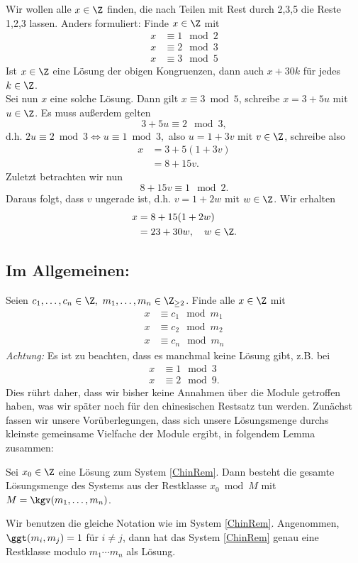 Wir wollen alle $x \in \Z$ finden, die nach Teilen mit Rest durch 2,3,5 die Reste 1,2,3 lassen. Anders formuliert: Finde $x \in \Z$ mit
\begin{align*}
	x &\equiv 1 \mod 2\\
	x &\equiv 2 \mod 3\\
	x &\equiv 3 \mod 5
\end{align*}
Ist $x \in \Z$ eine Lösung der obigen Kongruenzen, dann auch $x + 30k$ für jedes $k \in \Z$.\\
Sei nun $x$ eine solche Lösung. Dann gilt $x \equiv 3 \bmod 5$, schreibe $x = 3+5u$ mit $u \in \Z$. Es muss außerdem gelten
\[ 3 + 5u \equiv 2 \mod 3, \]
d.h. $2u \equiv 2 \bmod 3 \iff u \equiv 1 \bmod 3,$ also $u = 1+3v$ mit $v \in \Z$, schreibe also
\begin{align*}
	x &= 3+5(1+3v)\\
	&= 8+15v.
\end{align*}
Zuletzt betrachten wir nun 
\[ 8+15v \equiv 1 \mod 2. \]
Daraus folgt, dass $v$ ungerade ist, d.h. $v = 1+2w$ mit $w \in \Z$. Wir erhalten
\begin{align*}
	x &= 8+15(1+2w)\\
	&= 23+30w,\quad w \in \Z.
\end{align*}

\subsection*{Im Allgemeinen:}

Seien $c_1,\dotsc,c_n \in \Z,\ m_1,\dotsc,m_n \in \Z_{\geq 2}$. Finde alle $x \in \Z$ mit
\begin{equation}\label{ChinRem}
	\begin{split}
		x &\equiv c_1 \mod m_1\\
		x &\equiv c_2 \mod m_2\\
		x &\equiv c_n \mod m_n
	\end{split}
\end{equation}
\emph{Achtung:} Es ist zu beachten, dass es manchmal keine Lösung gibt, z.B. bei 
\begin{align*}
	x &\equiv 1 \mod 3\\
	x &\equiv 2 \mod 9.
\end{align*}
Dies rührt daher, dass wir bisher keine Annahmen über die Module getroffen haben, was wir später noch für den chinesischen Restsatz tun werden. Zunächst fassen wir unsere Vorüberlegungen, dass sich unsere Lösungsmenge durchs kleinste gemeinsame Vielfache der Module ergibt, in folgendem Lemma zusammen:

\begin{lem}\autolabel
	Sei $x_0 \in \Z$ eine Lösung zum System \ref{ChinRem}. Dann besteht die gesamte Lösungsmenge des Systems aus der Restklasse $x_0 \bmod M$ mit $M = \kgv(m_1,\dotsc,m_n)$.
\end{lem}

\begin{thm}\autolabel\video
	Wir benutzen die gleiche Notation wie im System \ref{ChinRem}. Angenommen, $\ggt(m_i,m_j)=1$ für $i \neq j$, dann hat das System \ref{ChinRem} genau eine Restklasse modulo $m_1 \dotsm m_n$ als Lösung.
\end{thm}
